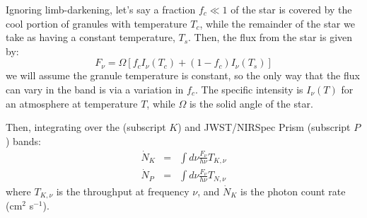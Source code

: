 Ignoring limb-darkening, let's say a fraction $f_c \ll 1$ of the star is covered by the cool portion of granules with temperature $T_c$, while the remainder of the star we take as having a constant temperature, $T_s$.
Then, the flux from the star is given by:
\begin{equation}
F _ { \nu } = \Omega \left[ f _ { c } I _ { \nu } \left( T _ { c } \right) + \left( 1- f _ { c } \right) I _ { \nu } \left( T _ { s } \right) \right]
\end{equation}
we will assume the granule temperature is constant, so the only way that the flux can vary in the \kepler band is via a variation in $f_c$.  The specific intensity is $I_\nu(T)$ for an atmosphere at temperature $T$, while $\Omega$ is the solid angle of the star.

Then, integrating over the \kepler (subscript $K$) and JWST/NIRSpec Prism (subscript $P$) bands:
\begin{eqnarray}
\dot { N } _ { K } &=& \int d \nu \frac { F _ { \nu } } { h \nu } T _ { K ,\nu } \\ 
\dot { N } _ { P } &=& \int d \nu \frac { F _ { \nu } } { h \nu } T _ { N ,\nu }
\end{eqnarray}
where $T_{K,\nu}$ is the \kepler throughput at frequency $\nu$,
and $\dot{N}_K$ is the photon count rate (cm$^2$ s$^{-1}$).

